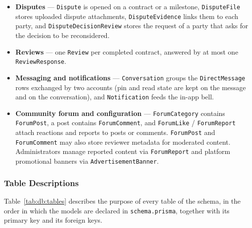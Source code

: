 \begin{itemize}[leftmargin=*]
    \item \textbf{Disputes} --- \texttt{Dispute} is opened on a contract or a milestone, \texttt{DisputeFile} stores uploaded dispute attachments, \texttt{DisputeEvidence} links them to each party, and \texttt{DisputeDecisionReview} stores the request of a party that asks for the decision to be reconsidered.
    \item \textbf{Reviews} --- one \texttt{Review} per completed contract, answered by at most one \texttt{ReviewResponse}.
    \item \textbf{Messaging and notifications} --- \texttt{Conversation} groups the \texttt{DirectMessage} rows exchanged by two accounts (pin and read state are kept on the message and on the conversation), and \texttt{Notification} feeds the in-app bell.
    \item \textbf{Community forum and configuration} --- \texttt{ForumCategory} contains \texttt{ForumPost}, a post contains \texttt{ForumComment}, and \texttt{ForumLike} / \texttt{ForumReport} attach reactions and reports to posts or comments. \texttt{ForumPost} and \texttt{ForumComment} may also store reviewer metadata for moderated content. Administrators manage reported content via \texttt{ForumReport} and platform promotional banners via \texttt{AdvertisementBanner}.
\end{itemize}

\subsubsection*{Table Descriptions}

Table~\ref{tab:db:tables} describes the purpose of every table of the schema, in the
order in which the models are declared in \texttt{schema.prisma}, together with its
primary key and its foreign keys.

